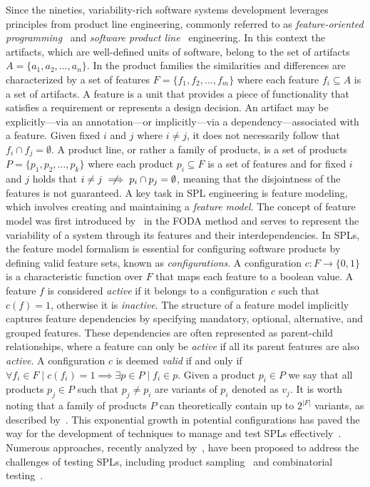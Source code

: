 Since the nineties, variability-rich software systems development leverages principles from product line engineering, commonly referred to as \textit{feature-oriented programming}~\cite{Prehofer97} and \textit{software product line}~\cite{Clements01} engineering.
In this context the artifacts, which are well-defined units of software, belong to the set of artifacts \(A = \{a_1, a_2, \ldots, a_n\}\).
In the product families the similarities and differences are characterized by a set of features \(F = \{f_1, f_2, \ldots, f_m\}\) where each feature \(f_i \subseteq A\) is a set of artifacts.
A feature is a unit that provides a piece of functionality that satisfies a requirement or represents a design decision. An artifact may be explicitly---via an annotation---or implicitly---via a dependency---associated with a feature.
Given fixed \(i\) and \(j\) where \(i \neq j\), it does not necessarily follow that \(f_i \cap f_j = \emptyset\).
A product line, or rather a family of products, is a set of products \(P = \{p_1, p_2, \ldots, p_k\}\) where each product \(p_i \subseteq F\) is a set of features and for fixed \(i\) and \(j\) holds that \(i \neq j \centernot\implies p_i \cap p_j = \emptyset\), meaning that the disjointness of the features is not guaranteed.
A key task in SPL engineering is feature modeling, which involves creating and maintaining a \emph{feature model}. The concept of feature model was first introduced by~\citet{Kang90} in the FODA method and serves to represent the variability of a system through its features and their interdependencies. In SPLs, the feature model formalism is essential for configuring software products by defining valid feature sets, known as \emph{configurations}. 
A configuration \(c:F\rightarrow \{0, 1\}\) is a characteristic function over \(F\) that maps each feature to a boolean value. 
A feature $f$ is considered \emph{active} if it belongs to a configuration \(c\) such that \(c(f)=1\), otherwise it is \emph{inactive}.
The structure of a feature model implicitly captures feature dependencies by specifying mandatory, optional, alternative, and grouped features. These dependencies are often represented as parent-child relationships, where a feature can only be \emph{active} if all its parent features are also \emph{active}. 
A configuration \(c\) is deemed \emph{valid} if and only if \(\forall f_i\in F\mid c(f_i)=1\implies\exists p\in P\mid f_i\in p\).
Given a product \(p_i \in P\) we say that all products \(p_j \in P\) such that \(p_j \neq p_i\) are variants of \(p_i\) denoted as \(v_j\).
It is worth noting that a family of products \(P\) can theoretically contain up to \(2^{|F|}\) variants, as described by~\citet{Krueger06}. This exponential growth in potential configurations has paved the way for the development of techniques to manage and test SPLs effectively~\cite{Pohl06}.
Numerous approaches, recently analyzed by~\citet{Agh24}, have been proposed to address the challenges of testing SPLs, including product sampling~\cite{Patel13, AlHajjaji19, Lee19} and combinatorial testing~\cite{Oster10, Lochau12}.


